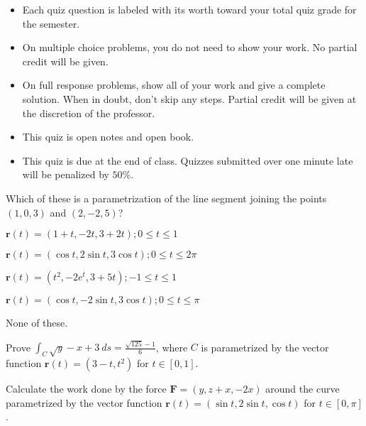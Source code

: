 \documentclass[12pt]{exam}
\newcommand{\vect}[1]{\ensuremath{\mathbf{#1}}}
\newcommand{\<}{(}
\renewcommand{\>}{)}
\begin{document}
\begin{center}
\end{center}
\vspace{0.1in}

\vspace{12pt}

\begin{itemize}
  \item Each quiz question is labeled with its worth toward your total quiz
        grade for the semester.
  \item On multiple choice problems, you do not need to show your work. No
        partial credit will be given.
  \item On full response problems, show all of your work and give a
        complete solution. When in doubt, don't skip any steps. Partial
        credit will be given at the discretion of the professor.
  \item This quiz is open notes and open book.
  \item This quiz is due at the end of class. Quizzes submitted over one minute
        late will be penalized by \(50\%\).
\end{itemize}

\newpage

\begin{questions}

\question[10]
Which of these is a parametrization of the line segment joining the
points \((1,0,3)\) and \((2,-2,5)\)?
\begin{checkboxes}
\item \(\vect r(t)=(1+t,-2t,3+2t); 0\leq t\leq 1\)
\item \(\vect r(t)=(\cos t,2\sin t,3\cos t); 0\leq t\leq 2\pi\)
\item \(\vect r(t)=(t^2,-2e^t,3+5t); -1\leq t\leq 1\)
\item \(\vect r(t)=(\cos t,-2\sin t,3\cos t); 0\leq t\leq \pi\)
\item None of these.
\end{checkboxes}

\question[10]
Prove \(\int_C \sqrt y-x+3~ds=\frac{\sqrt{125}-1}{6}\),
where \(C\) is parametrized by the vector
function \(\vect r(t)=(3-t,t^2)\) for \(t\in[0,1]\).

\newpage

\question[10]
Calculate the work done by the force \(\vect F=(y,z+x,-2x)\) around the
curve parametrized by the vector function
\(\vect r(t)=(\sin t,2\sin t,\cos t)\) for \(t\in[0,\pi]\).



\end{questions}
\end{document}
